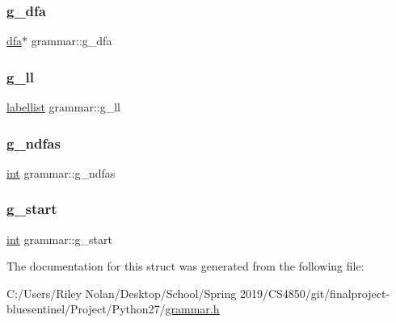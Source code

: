 \subsubsection{\texorpdfstring{g\_dfa}{g\_dfa}}
{\footnotesize\ttfamily \mbox{\hyperlink{structdfa}{dfa}}$\ast$ grammar\+::g\+\_\+dfa}

\mbox{\label{structgrammar_a44c2b2bf052d04fe115c96ebcd3cdb6d}} 
\subsubsection{\texorpdfstring{g\_ll}{g\_ll}}
{\footnotesize\ttfamily \mbox{\hyperlink{structlabellist}{labellist}} grammar\+::g\+\_\+ll}

\mbox{\label{structgrammar_abf22ce0269bc0d85b5664fc390f5441f}} 
\subsubsection{\texorpdfstring{g\_ndfas}{g\_ndfas}}
{\footnotesize\ttfamily \mbox{\hyperlink{warnings_8h_a74f207b5aa4ba51c3a2ad59b219a423b}{int}} grammar\+::g\+\_\+ndfas}

\mbox{\label{structgrammar_a07f66956b24bcf1d2560f64e97738843}} 
\subsubsection{\texorpdfstring{g\_start}{g\_start}}
{\footnotesize\ttfamily \mbox{\hyperlink{warnings_8h_a74f207b5aa4ba51c3a2ad59b219a423b}{int}} grammar\+::g\+\_\+start}



The documentation for this struct was generated from the following file\+:\begin{DoxyCompactItemize}
\item 
C\+:/\+Users/\+Riley Nolan/\+Desktop/\+School/\+Spring 2019/\+C\+S4850/git/finalproject-\/bluesentinel/\+Project/\+Python27/\mbox{\hyperlink{grammar_8h}{grammar.\+h}}\end{DoxyCompactItemize}
